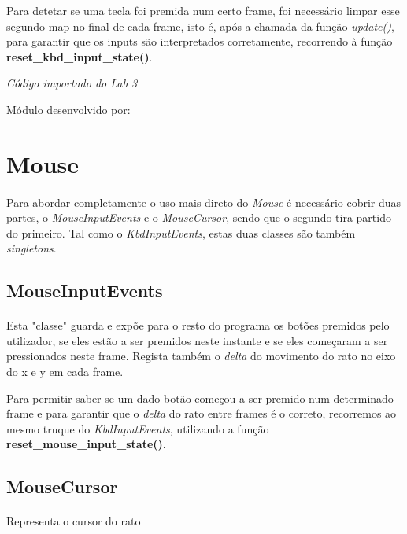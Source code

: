 \documentclass{report}
\begin{document}
Para detetar se uma tecla foi premida num certo frame, foi necessário limpar esse segundo map no final de cada frame, isto é, após a chamada da função \textit{update()}, para garantir que os inputs são interpretados corretamente, recorrendo à função \textbf{reset\_kbd\_input\_state()}.\newline

\textit{Código importado do Lab 3}\footnotemark[\value{footnote}]\newline

Módulo desenvolvido por: 

\section{Mouse}

\paragraph{}
Para abordar completamente o uso mais direto do \textit{Mouse} é necessário cobrir duas partes, o \textit{MouseInputEvents} e o \textit{MouseCursor}, sendo que o segundo tira partido do primeiro.
Tal como o \textit{KbdInputEvents}, estas duas classes são também \textit{singletons}.

\subsection{MouseInputEvents}

\paragraph{}
Esta "classe" guarda e expõe para o resto do programa os botões premidos pelo utilizador, se eles estão a ser premidos neste instante e se eles começaram a ser pressionados neste frame. Regista também o \textit{delta} do movimento do rato no eixo do x e y em cada frame.

Para permitir saber se um dado botão começou a ser premido num determinado frame e para garantir que o \textit{delta} do rato entre frames é o correto, recorremos ao mesmo truque do \textit{KbdInputEvents}, utilizando a função \textbf{reset\_mouse\_input\_state()}.

\subsection{MouseCursor}

\paragraph{}
Representa o cursor do rato\newline
\end{document}
